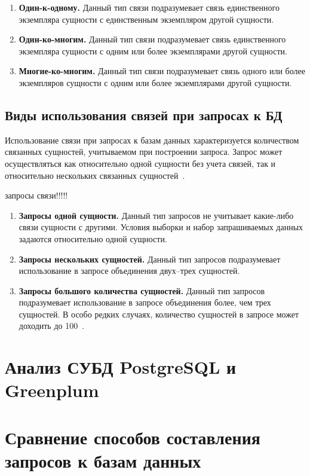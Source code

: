 \begin{enumerate}
	\item \textbf{Один-к-одному.} Данный тип связи подразумевает связь единственного экземпляра сущности с единственным экземпляром другой сущности.
	\item \textbf{Один-ко-многим.} Данный тип связи подразумевает связь единственного экземпляра сущности с одним или более экземплярами другой сущности.
	\item \textbf{Многие-ко-многим.} Данный тип связи подразумевает связь одного или более экземпляров сущности с одним или более экземплярами другой сущности.
\end{enumerate}

\subsection{Виды использования связей при запросах к БД}

Использование связи при запросах к базам данных характеризуется количеством связанных сущностей, учитываемом при построении запроса. Запрос может осуществляться как относительно одной сущности без учета связей, так и относительно нескольких связанных сущностей~\cite{li2021teaching}.

запросы связи!!!!!


\begin{enumerate}
	\item \textbf{Запросы одной сущности.} Данный тип запросов не учитывает какие-либо связи сущности с другими. Условия выборки и набор запрашиваемых данных задаются относительно одной сущности.
	\item \textbf{Запросы нескольких сущностей.} Данный тип запросов подразумевает использование в запросе объединения двух–трех сущностей. 
	\item \textbf{Запросы большого количества сущностей.} Данный тип запросов подразумевает использование в запросе объединения более, чем трех сущностей. В особо редких случаях, количество сущностей в запросе может доходить до 100~\cite{mancini2022efficient}.
\end{enumerate}

\section{Анализ СУБД PostgreSQL и Greenplum}

\section{Сравнение способов составления запросов к базам данных}

